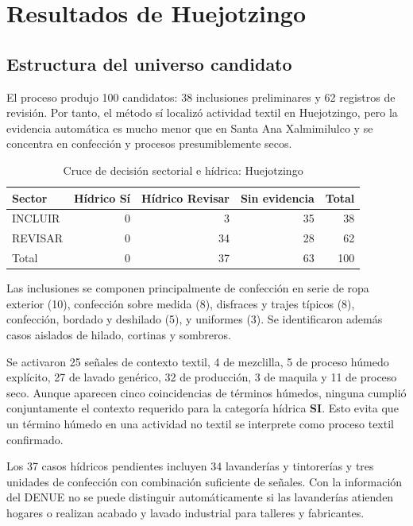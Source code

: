 \documentclass[11pt,letterpaper]{article}
\begin{document}
\section{Resultados de Huejotzingo}

\subsection{Estructura del universo candidato}

El proceso produjo 100 candidatos: 38 inclusiones preliminares y 62 registros de revisión. Por tanto, el método sí localizó actividad textil en Huejotzingo, pero la evidencia automática es mucho menor que en Santa Ana Xalmimilulco y se concentra en confección y procesos presumiblemente secos.

\begin{table}[H]
\centering
\caption{Cruce de decisión sectorial e hídrica: Huejotzingo}
\begin{tabular}{lrrrr}
\toprule
Sector & Hídrico Sí & Hídrico Revisar & Sin evidencia & Total\\
\midrule
INCLUIR & 0 & 3 & 35 & 38\\
REVISAR & 0 & 34 & 28 & 62\\
\midrule
Total & 0 & 37 & 63 & 100\\
\bottomrule
\end{tabular}
\end{table}

Las inclusiones se componen principalmente de confección en serie de ropa exterior (10), confección sobre medida (8), disfraces y trajes típicos (8), confección, bordado y deshilado (5), y uniformes (3). Se identificaron además casos aislados de hilado, cortinas y sombreros.

Se activaron 25 señales de contexto textil, 4 de mezclilla, 5 de proceso húmedo explícito, 27 de lavado genérico, 32 de producción, 3 de maquila y 11 de proceso seco. Aunque aparecen cinco coincidencias de términos húmedos, ninguna cumplió conjuntamente el contexto requerido para la categoría hídrica \textbf{SI}. Esto evita que un término húmedo en una actividad no textil se interprete como proceso textil confirmado.

Los 37 casos hídricos pendientes incluyen 34 lavanderías y tintorerías y tres unidades de confección con combinación suficiente de señales. Con la información del DENUE no se puede distinguir automáticamente si las lavanderías atienden hogares o realizan acabado y lavado industrial para talleres y fabricantes.
\end{document}
